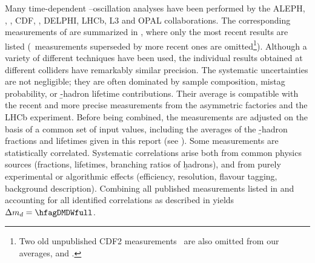 Many time-dependent \Bd--\Bdbar oscillation analyses have been performed by the 
ALEPH, \babar, \belle, CDF, \dzero, DELPHI, LHCb, L3 and OPAL collaborations. 
The corresponding measurements of \dmd are summarized in 
,
where only the most recent results
are listed (\ie\ measurements superseded by more recent ones are omitted\footnote{
  \label{foot:life_mix:CDFnote8235:2006}
  Two old unpublished CDF2 measurements~\cite{CDFnote8235:2006,CDFnote7920:2005}
  are also omitted from our averages,  and .}).
Although a variety of different techniques have been used, the 
individual \dmd
results obtained at different colliders have remarkably similar precision.
The systematic uncertainties are not negligible; 
they are often dominated by sample composition, mistag probability,
or \b-hadron lifetime contributions.
Their average is compatible with the recent and more precise measurements 
from the asymmetric \B factories and the LHCb experiment.
Before being combined, the measurements are adjusted on the basis of a 
common set of input values, including the averages of the 
\b-hadron fractions and lifetimes given in this report 
(see ).
Some measurements are statistically correlated. 
Systematic correlations arise both from common physics sources 
(fractions, lifetimes, branching ratios of \b hadrons), and from purely 
experimental or algorithmic effects (efficiency, resolution, flavour tagging, 
background description). Combining all published measurements
listed in 
and accounting for all identified correlations
as described in  yields $\dmd = \hfagDMDWfull$.

